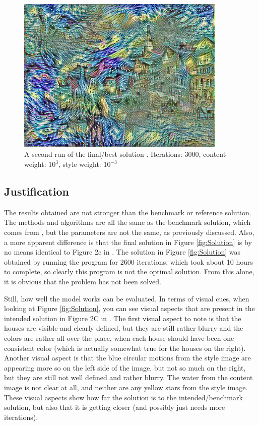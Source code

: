 \documentclass[12pt]{article}
\begin{document}
\begin{figure}
\centering
  \includegraphics[width=100mm, scale = 0.5]{solution3.jpg}
  \caption{A second run of the final/best solution . Iterations: $3000$, content weight: $10^3$, style weight: $10^{-3}$}
  \label{fig:Solution2}
\end{figure}

\subsection{Justification}
The results obtained are not stronger than the benchmark or reference solution. The methods and algorithms are all the same as the benchmark solution, which comes from \cite{Neural}, but the parameters are not the same, as previously discussed. Also, a more apparent difference is that the final solution in Figure \ref{fig:Solution} is by no means identical to Figure 2c in \cite{Neural}. The solution in Figure \ref{fig:Solution} was obtained by running the program for $2600$ iterations, which took about 10 hours to complete, so clearly this program is not the optimal solution. From this alone, it is obvious that the problem has not been solved. 

Still, how well the model works can be evaluated. In terms of visual cues, when looking at Figure \ref{fig:Solution}, you can see visual aspects that are present in the intended solution in Figure 2C in \cite{Neural}. The first visual aspect to note is that the houses are visible and clearly defined, but they are still rather blurry and the colors are rather all over the place, when each house should have been one consistent color (which is actually somewhat true for the houses on the right). Another visual aspect is that the blue circular motions from the style image are appearing more so on the left side of the image, but not so much on the right, but they are still not well defined and rather blurry. The water from the content image is not clear at all, and neither are any yellow stars from the style image. These visual aspects show how far the solution is to the intended/benchmark solution, but also that it is getting closer (and possibly just needs more iterations). 
\end{document}
